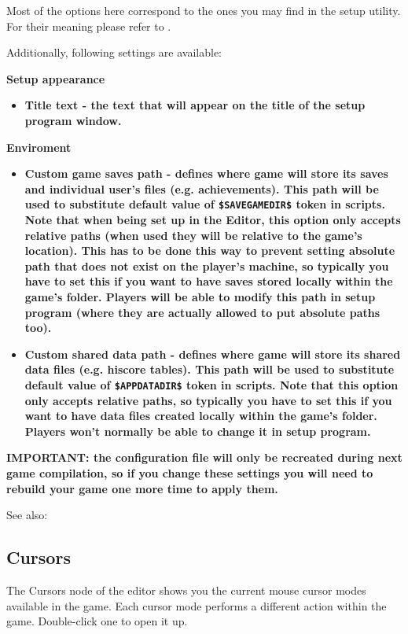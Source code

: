 Most of the options here correspond to the ones you may find in the setup utility. For their meaning please refer to .

Additionally, following settings are available:

\bf{Setup appearance}
\begin{itemize}
\item \bf{Title text} - the text that will appear on the title of the setup program window.
\end{itemize}

\bf{Enviroment}
\begin{itemize}
\item \bf{Custom game saves path} - defines where game will store its saves and individual user's files (e.g. achievements). This path will be used to substitute default value of \verb^$SAVEGAMEDIR$^ token in scripts. Note that when being set up in the Editor, this option only accepts relative paths (when used they will be relative to the game's location).
This has to be done this way to prevent setting absolute path that does not exist on the player's machine, so typically you have to set this if you want to have saves stored locally within the game's folder.
Players will be able to modify this path in setup program (where they are actually allowed to put absolute paths too).
\item \bf{Custom shared data path} - defines where game will store its shared data files (e.g. hiscore tables). This path will be used to substitute default value of \verb^$APPDATADIR$^ token in scripts. Note that this option only accepts relative paths, so typically you have to set this if you want to have data files created locally within the game's folder.
Players \bf{won't} normally be able to change it in setup program.
\end{itemize}

\bf{IMPORTANT:} the configuration file will only be recreated during next game compilation, so if you change these settings you will need to rebuild your game one more time to apply them.

See also: 


\subsection{Cursors}%

The Cursors node of the editor shows you the current mouse cursor modes available in
the game. Each cursor mode performs a different action within the game. Double-click
one to open it up.

